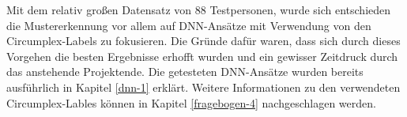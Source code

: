 


Mit dem relativ großen Datensatz von 88 Testpersonen, wurde sich entschieden die Mustererkennung vor allem auf DNN-Ansätze mit Verwendung von den Circumplex-Labels zu fokusieren.
Die Gründe dafür waren, dass sich durch dieses Vorgehen die besten Ergebnisse erhofft wurden und ein gewisser Zeitdruck durch das anstehende Projektende.
Die getesteten DNN-Ansätze wurden bereits ausführlich in Kapitel \ref{dnn-1} erklärt.
Weitere Informationen zu den verwendeten Circumplex-Lables können in Kapitel \ref{fragebogen-4} nachgeschlagen werden.